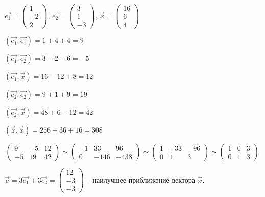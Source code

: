 $\vec{e_1} = \begin{pmatrix} 1 \\ -2 \\ 2 \end{pmatrix}$, $\vec{e_2} = \begin{pmatrix} 3 \\ 1 \\ -3 \end{pmatrix}$, $\vec{x} = \begin{pmatrix} 16 \\ 6 \\ 4 \end{pmatrix}$

$(\vec{e_1}, \vec{e_1}) = 1 + 4 + 4 = 9$

$(\vec{e_1}, \vec{e_2}) = 3 - 2 - 6 = -5$

$(\vec{e_1}, \vec{x}) = 16 - 12 + 8 = 12$

$(\vec{e_2}, \vec{e_2}) = 9 + 1 + 9 = 19$

$(\vec{e_2}, \vec{x}) = 48 + 6 - 12 = 42$

$(\vec{x}, \vec{x}) = 256 + 36 + 16 = 308$

\begin{equation*}
    \left(\begin{array}{cc|c}
        9 & -5 & 12 \\
        -5 & 19 & 42
    \end{array}\right)
    \sim
    \left(\begin{array}{cc|c}
        -1 & 33 & 96 \\
        0 & -146 & -438
    \end{array}\right)
    \sim
    \left(\begin{array}{cc|c}
        1 & -33 & -96 \\
        0 & 1 & 3
    \end{array}\right)
    \sim
    \left(\begin{array}{cc|c}
        1 & 0 & 3 \\
        0 & 1 & 3
    \end{array}\right)
.\end{equation*}

$\vec{c} = 3\vec{e_1} + 3\vec{e_2} = \begin{pmatrix} 12 \\ -3 \\ -3 \end{pmatrix}$ – наилучшее приближение вектора $\vec{x}$.

